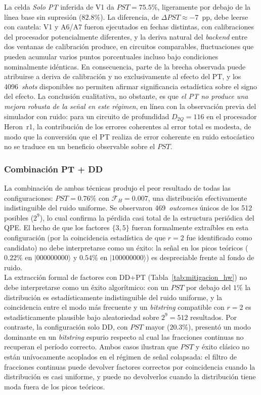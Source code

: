 \documentclass[12pt, spanish]{book}
\begin{document}
La celda \emph{Solo PT} inferida de V1 da $PST = 75.5\%$, ligeramente por debajo de la línea base sin supresión ($82.8\%$). La diferencia, de $\Delta PST \approx -7$~pp, debe leerse con cautela: V1 y A6/A7 fueron ejecutados en fechas distintas, con calibraciones del procesador potencialmente diferentes, y la deriva natural del \textit{backend} entre dos ventanas de calibración produce, en circuitos comparables, fluctuaciones que pueden acumular varios puntos porcentuales incluso bajo condiciones nominalmente idénticas. En consecuencia, parte de la brecha observada puede atribuirse a deriva de calibración y no exclusivamente al efecto del PT, y los 4096~\textit{shots} disponibles no permiten afirmar significancia estadística sobre el signo del efecto. La conclusión cualitativa, no obstante, es que \emph{el PT no produce una mejora robusta de la señal en este régimen}, en línea con la observación previa del simulador con ruido: para un circuito de profundidad $D_{2Q} = 116$ en el procesador Heron~r1, la contribución de los errores coherentes al error total es modesta, de modo que la conversión que el PT realiza de error coherente en ruido estocástico no se traduce en un beneficio observable sobre el $PST$.

\subsubsection{Combinación PT + DD}

La combinación de ambas técnicas produjo el peor resultado de todas las configuraciones: $PST = 0.76\%$ con $\mathcal{F}_H = 0.007$, una distribución efectivamente indistinguible del ruido uniforme. Se observaron 469~\textit{outcomes} únicos de los 512 posibles ($2^9$), lo cual confirma la pérdida casi total de la estructura periódica del QPE. El hecho de que los factores $\{3, 5\}$ fueran formalmente extraíbles en esta configuración (por la coincidencia estadística de que $r = 2$ fue identificado como candidato) no debe interpretarse como un éxito: la señal en los picos teóricos ($0.22\%$ en $|000000000\rangle$ y $0.54\%$ en $|100000000\rangle$) es despreciable frente al fondo de ruido.\\

La extracción formal de factores con DD$+$PT (Tabla~\ref{tab:mitigacion_hw}) no debe interpretarse como un éxito algorítmico: con un $PST$ por debajo del $1\%$ la distribución es estadísticamente indistinguible del ruido uniforme, y la coincidencia entre el modo más frecuente y un \textit{bitstring} compatible con $r = 2$ es estadísticamente plausible bajo aleatoriedad sobre $2^9 = 512$ resultados. Por contraste, la configuración solo DD, con $PST$ mayor ($20.3\%$), presentó un modo dominante en un \textit{bitstring} espurio respecto al cual las fracciones continuas no recuperan el período correcto. Ambos casos ilustran que $PST$ y éxito clásico no están unívocamente acoplados en el régimen de señal colapsada: el filtro de fracciones continuas puede devolver factores correctos por coincidencia cuando la distribución es casi uniforme, y puede no devolverlos cuando la distribución tiene moda fuera de los picos teóricos.\\
\end{document}

